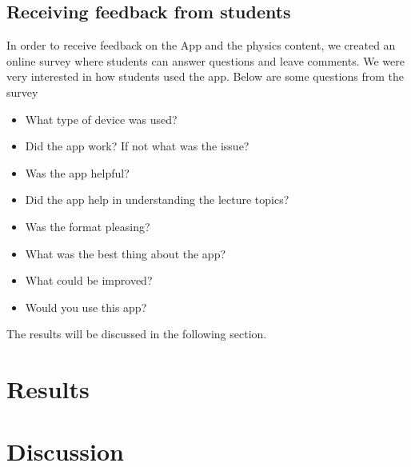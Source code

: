 \documentclass[12pt,a4paper]{article}  %
\begin{document}
\subsection{Receiving feedback from students}

In order to receive feedback on the App and the physics content, we created an online survey where students can answer questions and leave comments. We were very interested in how students used the app. Below are some questions from the survey

\begin{itemize}
\item What type of device was used?
\item Did the app work? If not what was the issue?
\item Was the app helpful?
\item Did the app help in understanding the lecture topics?
\item Was the format pleasing?
\item What was the best thing about the app?
\item What could be improved?
\item Would you use this app?
\end{itemize}

The results will be discussed in the following section.

\section{Results}

\section{Discussion}



\end{document}
